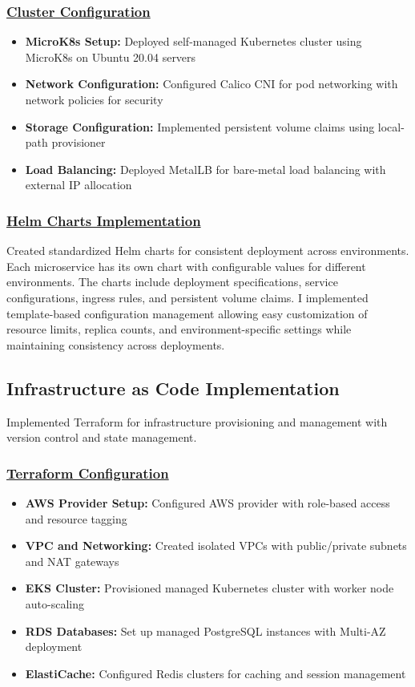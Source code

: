 \subsubsection*{\underline{Cluster Configuration}}
\begin{itemize}
    \item \textbf{MicroK8s Setup:} Deployed self-managed Kubernetes cluster using MicroK8s on Ubuntu 20.04 servers
    \item \textbf{Network Configuration:} Configured Calico CNI for pod networking with network policies for security
    \item \textbf{Storage Configuration:} Implemented persistent volume claims using local-path provisioner
    \item \textbf{Load Balancing:} Deployed MetalLB for bare-metal load balancing with external IP allocation
\end{itemize}

\subsubsection*{\underline{Helm Charts Implementation}}
Created standardized Helm charts for consistent deployment across environments. Each microservice has its own chart with configurable values for different environments. The charts include deployment specifications, service configurations, ingress rules, and persistent volume claims. I implemented template-based configuration management allowing easy customization of resource limits, replica counts, and environment-specific settings while maintaining consistency across deployments.

\subsection{Infrastructure as Code Implementation}
Implemented Terraform for infrastructure provisioning and management with version control and state management.

\subsubsection*{\underline{Terraform Configuration}}
\begin{itemize}
    \item \textbf{AWS Provider Setup:} Configured AWS provider with role-based access and resource tagging
    \item \textbf{VPC and Networking:} Created isolated VPCs with public/private subnets and NAT gateways
    \item \textbf{EKS Cluster:} Provisioned managed Kubernetes cluster with worker node auto-scaling
    \item \textbf{RDS Databases:} Set up managed PostgreSQL instances with Multi-AZ deployment
    \item \textbf{ElastiCache:} Configured Redis clusters for caching and session management
\end{itemize}


